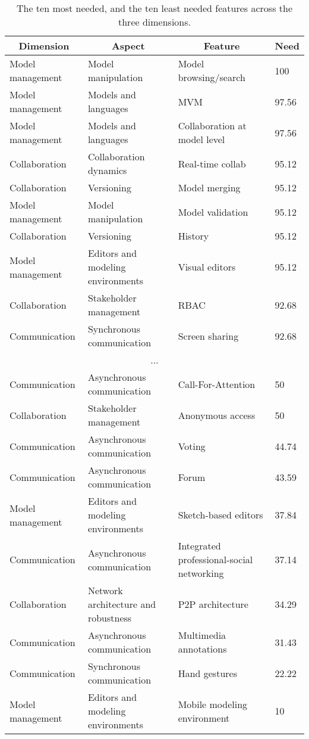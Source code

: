 
  \begin{table*}[]
  \centering
  \notsotiny
  \caption{ The ten most needed, and the ten least needed features across the three dimensions.}
\label{tab:top-bottom-need}
\begin{tabular}{@{}llll@{}}
  \toprule
\multicolumn{1}{c}{\textbf{Dimension}} & \multicolumn{1}{c}{\textbf{Aspect}} & \multicolumn{1}{c}{\textbf{Feature}} & \multicolumn{1}{c}{\textbf{Need}} \\ 

  \midrule
  Model management & Model manipulation & Model browsing/search & 100 \\ 
Model management & Models and languages & MVM & 97.56 \\ 
Model management & Models and languages & Collaboration at model level & 97.56 \\ 
Collaboration & Collaboration dynamics & Real-time collab & 95.12 \\ 
Collaboration & Versioning & Model merging & 95.12 \\ 
Model management & Model manipulation & Model validation & 95.12 \\ 
Collaboration & Versioning & History & 95.12 \\ 
Model management & Editors and modeling environments & Visual editors & 95.12 \\ 
Collaboration & Stakeholder management & RBAC & 92.68 \\ 
Communication & Synchronous communication & Screen sharing & 92.68 \\ 
\multicolumn{4}{c}{...} \\ 
Communication & Asynchronous communication & Call-For-Attention & 50 \\ 
Collaboration & Stakeholder management & Anonymous access & 50 \\ 
Communication & Asynchronous communication & Voting & 44.74 \\ 
Communication & Asynchronous communication & Forum & 43.59 \\ 
Model management & Editors and modeling environments & Sketch-based editors & 37.84 \\ 
Communication & Asynchronous communication & Integrated professional-social networking & 37.14 \\ 
Collaboration & Network architecture and robustness & P2P architecture & 34.29 \\ 
Communication & Asynchronous communication & Multimedia annotations & 31.43 \\ 
Communication & Synchronous communication & Hand gestures & 22.22 \\ 
Model management & Editors and modeling environments & Mobile modeling environment & 10 \\ 
\bottomrule
  \end{tabular}%
  \end{table*}